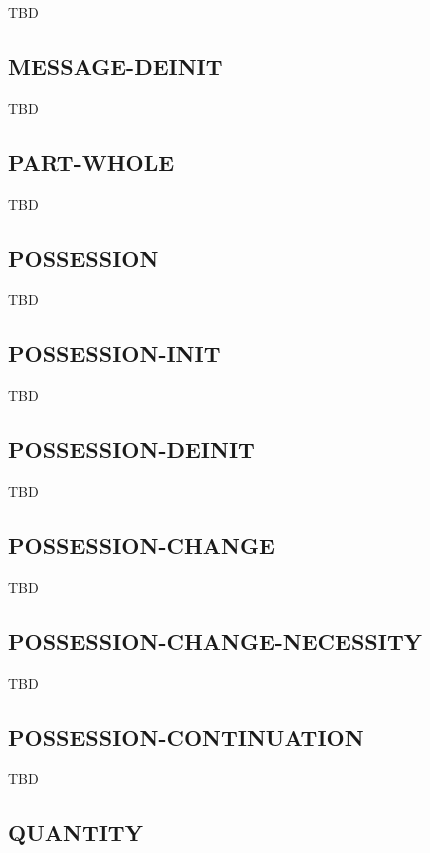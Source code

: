 \documentclass[a4paper]{article}
\newcommand{\fr}[1]{\textsf{#1}}
\begin{document}
TBD

\subsection{\fr{MESSAGE-DEINIT}}
\label{sec:MESSAGE-DEINIT}

TBD

\subsection{\fr{PART-WHOLE}}
\label{sec:PART-WHOLE}

TBD

\subsection{\fr{POSSESSION}}
\label{sec:POSSESSION}

TBD

\subsection{\fr{POSSESSION-INIT}}
\label{sec:POSSESSION-INIT}

TBD

\subsection{\fr{POSSESSION-DEINIT}}
\label{sec:POSSESSION-DEINIT}

TBD

\subsection{\fr{POSSESSION-CHANGE}}
\label{sec:POSSESSION-CHANGE}

TBD

\subsection{\fr{POSSESSION-CHANGE-NECESSITY}}
\label{sec:POSSESSION-CHANGE-NECESSITY}

TBD

\subsection{\fr{POSSESSION-CONTINUATION}}
\label{sec:POSSESSION-CONTINUATION}

TBD

\subsection{\fr{QUANTITY}}
\label{sec:QUANTITY}
\end{document}
